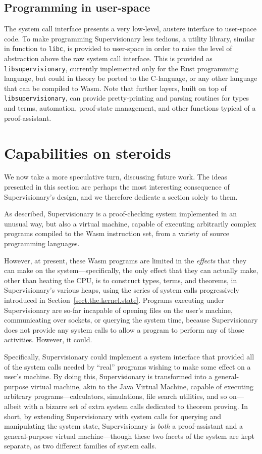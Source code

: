 \documentclass[a4paper, UKenglish, cleveref, autoref, thm-restate, colorlinks]{lipics-v2021}
\begin{document}
\subsection{Programming in user-space}

The system call interface presents a very low-level, austere interface to user-space code.
To make programming Supervisionary less tedious, a utility library, similar in function to \texttt{libc}, is provided to user-space in order to raise the level of abstraction above the raw system call interface.
This is provided as \texttt{libsupervisionary}, currently implemented only for the Rust programming language, but could in theory be ported to the C-language, or any other language that can be compiled to Wasm.
Note that further layers, built on top of \texttt{libsupervisionary}, can provide pretty-printing and parsing routines for types and terms, automation, proof-state management, and other functions typical of a proof-assistant.

\section{Capabilities on steroids}
\label{sect.capabilities.on.steroids}

We now take a more speculative turn, discussing future work.
The ideas presented in this section are perhaps the most interesting consequence of Supervisionary's design, and we therefore dedicate a section solely to them.

As described, Supervisionary is a proof-checking system implemented in an unusual way, but also a virtual machine, capable of executing arbitrarily complex programs compiled to the Wasm instruction set, from a variety of source programming languages.

However, at present, these Wasm programs are limited in the \emph{effects} that they can make on the system---specifically, the only effect that they can actually make, other than heating the CPU, is to construct types, terms, and theorems, in Supervisionary's various heaps, using the series of system calls progressively introduced in Section~\ref{sect.the.kernel.state}.
Programs executing under Supervisionary are so-far incapable of opening files on the user's machine, communicating over sockets, or querying the system time, because Supervisionary does not provide any system calls to allow a program to perform any of those activities.
However, it could.

Specifically, Supervisionary could implement a system interface that provided all of the system calls needed by ``real'' programs wishing to make some effect on a user's machine.
By doing this, Supervisionary is transformed into a general-purpose virtual machine, akin to the Java Virtual Machine, capable of executing arbitrary programs---calculators, simulations, file search utilities, and so on---albeit with a bizarre set of extra system calls dedicated to theorem proving.
In short, by extending Supervisionary with system calls for querying and manipulating the system state, Supervisionary is \emph{both} a proof-assistant and a general-purpose virtual machine---though these two facets of the system are kept separate, as two different families of system calls.
\end{document}
